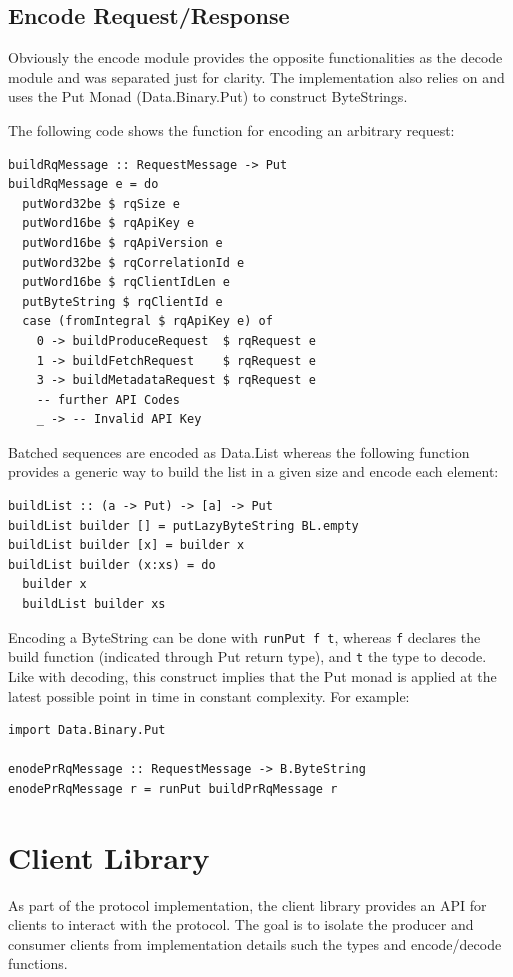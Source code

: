 \subsection{Encode Request/Response}
\label{sec:impl-prot-encoding}
Obviously the encode module provides the opposite functionalities as the decode
module and was separated just for clarity. The implementation also relies on
and uses the Put Monad (Data.Binary.Put) to construct ByteStrings.

The following code shows the function for encoding an arbitrary request:
\begin{lstlisting}[caption={Encode RequestMessage, depending on ApiKey}]
buildRqMessage :: RequestMessage -> Put
buildRqMessage e = do
  putWord32be $ rqSize e
  putWord16be $ rqApiKey e
  putWord16be $ rqApiVersion e
  putWord32be $ rqCorrelationId e
  putWord16be $ rqClientIdLen e
  putByteString $ rqClientId e
  case (fromIntegral $ rqApiKey e) of
    0 -> buildProduceRequest  $ rqRequest e
    1 -> buildFetchRequest    $ rqRequest e
    3 -> buildMetadataRequest $ rqRequest e
    -- further API Codes 
    _ -> -- Invalid API Key 
\end{lstlisting}

Batched sequences are encoded as Data.List whereas the following function
provides a generic way to build the list in a given size and encode each element:
\begin{lstlisting}[caption={Encode list of any type}]
buildList :: (a -> Put) -> [a] -> Put
buildList builder [] = putLazyByteString BL.empty
buildList builder [x] = builder x
buildList builder (x:xs) = do 
  builder x
  buildList builder xs
\end{lstlisting}

Encoding a ByteString can be done with \lstinline{runPut f t}, whereas
\lstinline{f} declares the build function (indicated through Put return type),
and  \lstinline{t} the type to decode. Like with decoding, this construct
implies that the Put monad is applied at the latest possible point in time in
constant complexity. For example: 
\begin{lstlisting}
import Data.Binary.Put

enodePrRqMessage :: RequestMessage -> B.ByteString
enodePrRqMessage r = runPut buildPrRqMessage r
\end{lstlisting}

\section{Client Library}
\label{sec:impl-prot-client}
As part of the protocol implementation, the client library provides an
API for clients to interact with the protocol. The goal is to isolate the
producer and consumer clients from implementation details such the types and
encode/decode functions.

